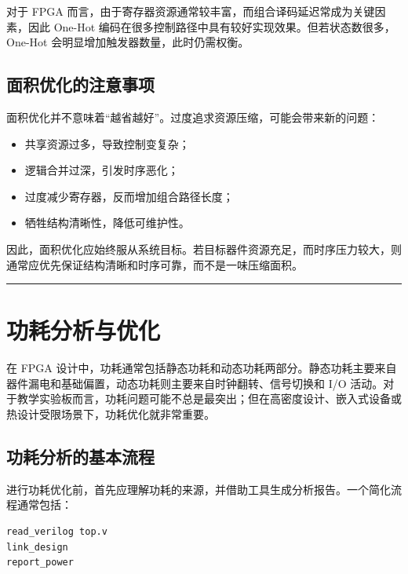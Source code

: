 对于 FPGA
而言，由于寄存器资源通常较丰富，而组合译码延迟常成为关键因素，因此
One-Hot 编码在很多控制路径中具有较好实现效果。但若状态数很多，One-Hot
会明显增加触发器数量，此时仍需权衡。

\subsection{面积优化的注意事项}\label{ux9762ux79efux4f18ux5316ux7684ux6ce8ux610fux4e8bux9879}

面积优化并不意味着``越省越好''。过度追求资源压缩，可能会带来新的问题：

\begin{itemize}
\tightlist
\item
  共享资源过多，导致控制变复杂；
\item
  逻辑合并过深，引发时序恶化；
\item
  过度减少寄存器，反而增加组合路径长度；
\item
  牺牲结构清晰性，降低可维护性。
\end{itemize}

因此，面积优化应始终服从系统目标。若目标器件资源充足，而时序压力较大，则通常应优先保证结构清晰和时序可靠，而不是一味压缩面积。

\begin{center}\rule{0.5\linewidth}{0.5pt}\end{center}

\section{功耗分析与优化}\label{ux529fux8017ux5206ux6790ux4e0eux4f18ux5316}

在 FPGA
设计中，功耗通常包括静态功耗和动态功耗两部分。静态功耗主要来自器件漏电和基础偏置，动态功耗则主要来自时钟翻转、信号切换和
I/O
活动。对于教学实验板而言，功耗问题可能不总是最突出；但在高密度设计、嵌入式设备或热设计受限场景下，功耗优化就非常重要。

\subsection{功耗分析的基本流程}\label{ux529fux8017ux5206ux6790ux7684ux57faux672cux6d41ux7a0b}

进行功耗优化前，首先应理解功耗的来源，并借助工具生成分析报告。一个简化流程通常包括：

\begin{lstlisting}[language=tcl]
read_verilog top.v
link_design
report_power
\end{lstlisting}

